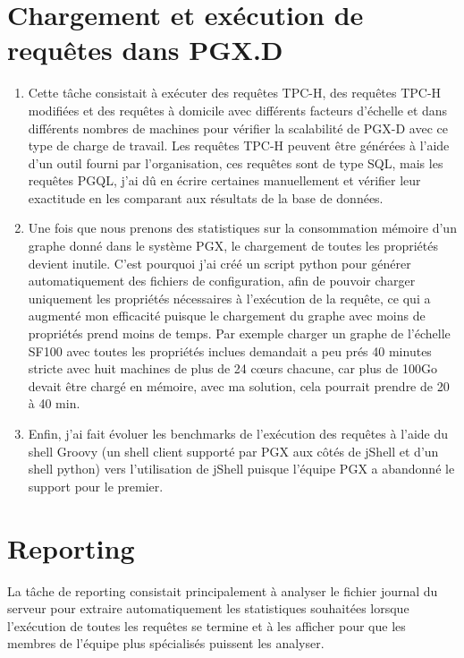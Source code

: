\section{Chargement et exécution de requêtes dans PGX.D}
\begin{enumerate}[label=\arabic*)]
\item Cette tâche consistait à exécuter des requêtes TPC-H, des requêtes TPC-H modifiées et des requêtes à domicile avec différents facteurs d'échelle et dans différents nombres de machines pour vérifier la scalabilité de PGX-D avec ce type de charge de travail. Les requêtes TPC-H peuvent être générées à l'aide d'un outil fourni par l'organisation, ces requêtes sont de type SQL, mais les requêtes PGQL, j'ai dû en écrire certaines manuellement et vérifier leur exactitude en les comparant aux résultats de la base de données.
\item Une fois que nous prenons des statistiques sur la consommation mémoire d'un graphe donné dans le système PGX, le chargement de toutes les propriétés devient inutile. C'est pourquoi j'ai créé un script python pour générer automatiquement des fichiers de configuration, afin de pouvoir charger uniquement les propriétés nécessaires à l'exécution de la requête, ce qui a augmenté mon efficacité puisque le chargement du graphe avec moins de propriétés prend moins de temps. Par exemple charger un graphe de l’échelle SF100 avec toutes les propriétés inclues demandait a peu prés 40 minutes stricte avec huit machines de plus de 24 cœurs chacune, car plus de 100Go devait être chargé en mémoire, avec ma solution, cela pourrait prendre de 20 à 40 min.
\item Enfin, j'ai fait évoluer les benchmarks de l'exécution des requêtes à l'aide du shell Groovy (un shell client supporté par PGX aux côtés de jShell et d'un shell python) vers l'utilisation de jShell puisque l'équipe PGX a abandonné le support pour le premier.
\end{enumerate}

\section{Reporting}
La tâche de reporting consistait principalement à analyser le fichier journal du serveur pour extraire automatiquement les statistiques souhaitées lorsque l'exécution de toutes les requêtes se termine et à les afficher pour que les membres de l'équipe plus spécialisés puissent les analyser.\\

